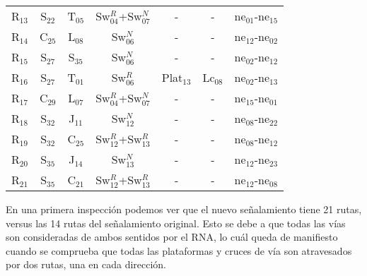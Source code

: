 \begin{table}[H]
{{\begin{tabular}{ c c c c c c c }
                    R$_{13}$  & S$_{22}$ & T$_{05}$ & Sw$_{04}^{R}$+Sw$_{07}^{N}$ & - & - & ne$_{01}$-ne$_{15}$\\
                    R$_{14}$  & C$_{25}$ & L$_{08}$ & Sw$_{06}^{N}$ & - & - & ne$_{12}$-ne$_{02}$\\
                    R$_{15}$  & S$_{27}$ & S$_{35}$ & Sw$_{06}^{N}$ & - & - & ne$_{02}$-ne$_{12}$\\
                    R$_{16}$  & S$_{27}$ & T$_{01}$ & Sw$_{06}^{R}$ & Plat$_{13}$ & Lc$_{08}$ & ne$_{02}$-ne$_{13}$\\
                    R$_{17}$  & C$_{29}$ & L$_{07}$ & Sw$_{04}^{R}$+Sw$_{07}^{N}$ & - & - & ne$_{15}$-ne$_{01}$\\
                    R$_{18}$  & S$_{32}$ & J$_{11}$ & Sw$_{12}^{N}$ & - & - & ne$_{08}$-ne$_{22}$\\
                    R$_{19}$  & S$_{32}$ & C$_{25}$ & Sw$_{12}^{R}$+Sw$_{13}^{R}$ & - & - & ne$_{08}$-ne$_{12}$\\
                    R$_{20}$  & S$_{35}$ & J$_{14}$ & Sw$_{13}^{N}$ & - & - & ne$_{12}$-ne$_{23}$\\
                    R$_{21}$  & S$_{35}$ & C$_{21}$ & Sw$_{12}^{R}$+Sw$_{13}^{R}$ & - & - & ne$_{12}$-ne$_{08}$\\
                \hline
            \end{tabular}
        }
     }
    \end{table}
    
    En una primera inspección podemos ver que el nuevo señalamiento tiene 21 rutas, versus las 14 rutas del señalamiento original. Esto se debe a que todas las vías son consideradas de ambos sentidos por el RNA, lo cuál queda de manifiesto cuando se comprueba que todas las plataformas y cruces de vía son atravesados por dos rutas, una en cada dirección. 